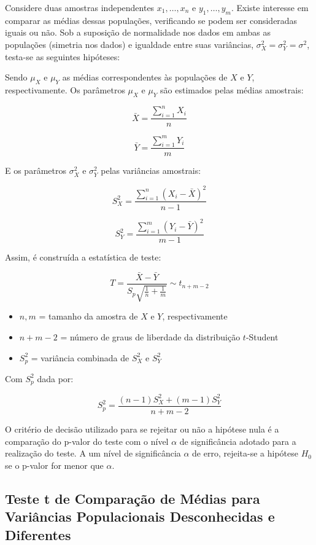 \documentclass[
]{estat/estat}
\providecommand{\tightlist}{%
  \setlength{\itemsep}{0pt}\setlength{\parskip}{0pt}}\usepackage{longtable,booktabs,array}
\begin{document}
Considere duas amostras independentes \(x_1, \ldots, x_n\) e
\(y_1, \ldots, y_m\). Existe interesse em comparar as médias dessas
populações, verificando se podem ser consideradas iguais ou não. Sob a
suposição de normalidade nos dados em ambas as populações (simetria nos
dados) e igualdade entre suas variâncias,
\(\sigma_X^2 = \sigma_Y^2 = \sigma^2\), testa-se as seguintes hipóteses:


Sendo \(\mu_X\) e \(\mu_Y\) as médias correspondentes às populações de
\(X\) e \(Y\), respectivamente. Os parâmetros \(\mu_X\) e \(\mu_Y\) são
estimados pelas médias amostrais:

\[
\bar{X} = \frac{\sum_{i=1}^{n} X_i}{n}
\]

\[
\bar{Y} = \frac{\sum_{i=1}^{m} Y_i}{m}
\]

E os parâmetros \(\sigma_X^2\) e \(\sigma_Y^2\) pelas variâncias
amostrais:

\[
S_X^2 = \frac{\sum_{i=1}^{n} (X_i - \bar{X})^2}{n-1}
\]

\[
S_Y^2 = \frac{\sum_{i=1}^{m} (Y_i - \bar{Y})^2}{m-1}
\]

Assim, é construída a estatística de teste:

\[
T = \frac{\bar{X} - \bar{Y}}{S_p \sqrt{\frac{1}{n} + \frac{1}{m}}} \sim t_{n+m-2}
\]

\begin{itemize}
\tightlist
\item
  \(n, m\) = tamanho da amostra de \(X\) e \(Y\), respectivamente
\item
  \(n+m-2\) = número de graus de liberdade da distribuição \(t\)-Student
\item
  \(S_p^2\) = variância combinada de \(S_X^2\) e \(S_Y^2\)
\end{itemize}

Com \(S_p^2\) dada por:

\[
S_p^2 = \frac{(n-1)S^2_X + (m-1)S^2_Y}{n+m-2}
\]

O critério de decisão utilizado para se rejeitar ou não a hipótese nula
é a comparação do p-valor do teste com o nível \(\alpha\) de
significância adotado para a realização do teste. A um nível de
significância \(\alpha\) de erro, rejeita-se a hipótese \(H_{0}\) se o
p-valor for menor que \(\alpha\).

\subsection{Teste t de Comparação de Médias para Variâncias
Populacionais Desconhecidas e
Diferentes}\label{teste-t-de-comparauxe7uxe3o-de-muxe9dias-para-variuxe2ncias-populacionais-desconhecidas-e-diferentes}
\end{document}
